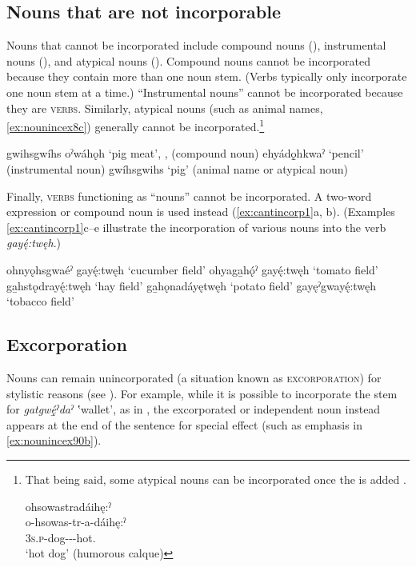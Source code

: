 \subsection{Nouns that are not incorporable} \label{ch:Nouns that are not incorporable}
Nouns that cannot be incorporated include compound nouns (), instrumental nouns (), and atypical nouns (). Compound nouns  cannot be incorporated because they contain more than one noun stem. (Verbs typically only incorporate one noun stem at a time.) “Instrumental nouns”  cannot be incorporated because they are \textsc{verbs}. Similarly, atypical nouns (such as animal names, \ref{ex:nounincex8c}) generally cannot be incorporated.\footnote{That being said, some atypical nouns can be incorporated once the  {\nominalizer} is added .

\ea\label{ex:nounincex300} ohsowastradáihę:ˀ \\
\gll o-hsowas-tr-a-dáihę:ˀ \\
\textsc{3s.p}-dog-{\nominalizer}-{\joinerA}-hot.{\stative}\\
\glt ‘hot dog’ (humorous calque)
\z} 

\ea\label{ex:nounincex8}
\ea gwihsgwíhs oˀwáhǫh ‘pig meat’, ,  (compound noun)\label{ex:nounincex8a}
\ex ehyádǫ̱hkwaˀ ‘pencil’ (instrumental noun)\label{ex:nounincex8b}
\ex gwíhsgwihs ‘pig’ (animal name or atypical noun)\label{ex:nounincex8c}
\z
\z

Finally, \textsc{verbs} functioning as “nouns” cannot be incorporated. A two-word expression or compound noun is used instead (\ref{ex:cantincorp1}a, b). (Examples \ref{ex:cantincorp1}c--e illustrate the incorporation of various nouns into the verb \textit{gayę́:twęh}.)

\ea\label{ex:cantincorp1}
\ea ohnyǫhsgwaéˀ gayę́:twęh ‘cucumber field’
\ex ohyaga̱hǫ́ˀ gayę́:twęh ‘tomato field’
\ex ga̱hstǫdrayę́:twęh ‘hay field’
\ex ga̱hǫnadáyętwęh ‘potato field’
\ex gayęˀgwayę́:twęh ‘tobacco field’
\z
\z


\subsection{Excorporation} \label{ch:Excorporation}
Nouns can remain unincorporated (a situation known as \textsc{excorporation}) for stylistic reasons (see ). For example, while it is possible to incorporate the stem for \textit{gatgwę̱́ˀdaˀ} ‛wallet’, as in , the excorporated or independent noun instead appears at the end of the sentence for special effect (such as emphasis in \ref{ex:nounincex90b}).

